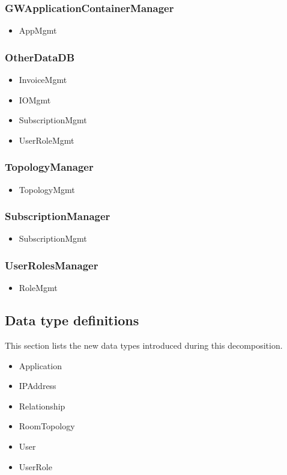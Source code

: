     \subsubsection{GWApplicationContainerManager}
        \begin{itemize}
            \item AppMgmt
        \end{itemize}

    \subsubsection{OtherDataDB}
        \begin{itemize}
            \item InvoiceMgmt
            \item IOMgmt
            \item SubscriptionMgmt
            \item UserRoleMgmt
        \end{itemize}

    \subsubsection{TopologyManager}
        \begin{itemize}
            \item TopologyMgmt
        \end{itemize}

    \subsubsection{SubscriptionManager}
        \begin{itemize}
            \item SubscriptionMgmt
        \end{itemize}

    \subsubsection{UserRolesManager}
        \begin{itemize}
            \item RoleMgmt
        \end{itemize}


\subsection{Data type definitions}
    This section lists the new data types introduced during this decomposition.

    \begin{itemize}
        \item Application
        \item IPAddress
        \item Relationship
        \item RoomTopology
        \item User
        \item UserRole
    \end{itemize}
